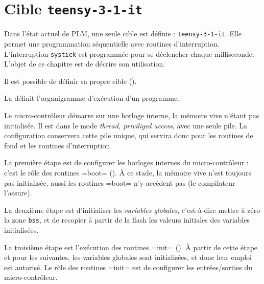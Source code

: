 




\chapter{Cible \texttt{teensy-3-1-it}}

Dans l'état actuel de PLM, une seule cible est définie : \texttt{teensy-3-1-it}.  Elle permet une programmation séquentielle avec routines d'interruption. L'interruption \texttt{systick} est programmée pour se déclencher chaque milliseconde. L'objet de ce chapitre est de décrire son utilisation.

Il est possible de définir sa propre cible ().





















La  définit l'organigramme d'exécution d'un programme.

Le micro-contrôleur démarre sur une horloge interne, la mémoire vive n'étant pas initialisée. Il est dans le mode \emph{thread, priviliged access}, avec une seule pile. La configuration conservera cette pile unique, qui servira donc pour les routines de fond et les routines d'interruption.

La première étape est de configurer les horloges internes du micro-contrôleur : c'est le rôle des routines \plm=boot= (). À ce stade, la mémoire vive n'est toujours pas initialisée, aussi les routines \plm=boot= n'y accèdent pas (le compilateur l'assure).

La deuxième étape est d'initialiser les \emph{variables globales}, c'est-à-dire mettre à zéro la zone \texttt{bss}, et de recopier à partir de la flash les valeurs initiales des variables initialisées.

La troisième étape est l'exécution des routines \plm=init= (). À partir de cette étape et pour les suivantes, les variables globales sont initialisées, et donc leur emploi est autorisé. Le rôle des routines \plm=init= est de configurer les entrées/sorties du micro-contrôleur.

